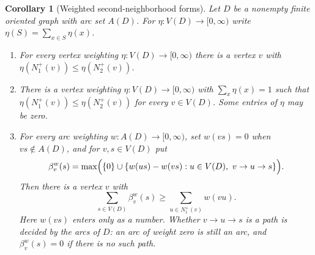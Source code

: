 \documentclass[11pt]{article}
\newtheorem{corollary}[theorem]{Corollary}
\theoremstyle{remark}
\begin{document}
\begin{corollary}[Weighted second-neighborhood forms]\label{cor:weighted-forms}
Let \(D\) be a nonempty finite oriented graph with arc set \(A(D)\).  For
\(\eta:V(D)\to[0,\infty)\) write \(\eta(S)=\sum_{x\in S}\eta(x)\).
\begin{enumerate}[label=\textup{(\roman*)}]
\item For every vertex weighting \(\eta:V(D)\to[0,\infty)\) there is a
vertex \(v\) with
\(\eta(N_1^+(v))\leq\eta(N_2^+(v))\).

\item There is a vertex weighting \(\eta:V(D)\to[0,\infty)\) with
\(\sum_{x}\eta(x)=1\) such that
\(\eta(N_1^+(v))\leq\eta(N_2^+(v))\) for every \(v\in V(D)\).
Some entries of $\eta$ may be zero.

\item For every arc weighting \(w:A(D)\to[0,\infty)\), set \(w(vs)=0\) when
\(vs\notin A(D)\), and for \(v,s\in V(D)\) put
\[
 \beta_v^w(s)=\max\Bigl(\{0\}\cup
 \{w(us)-w(vs):u\in V(D),\ v\to u\to s\}\Bigr).
\]
Then there is a vertex \(v\) with
\[
 \sum_{s\in V(D)}\beta_v^w(s)
 \geq \sum_{u\in N_1^+(v)}w(vu).
\]
Here $w(vs)$ enters only as a number.  Whether $v\to u\to s$ is a path is
decided by the arcs of $D$: an arc of weight zero is still an arc, and
$\beta_v^w(s)=0$ if there is no such path.
\end{enumerate}
\end{corollary}
\end{document}
